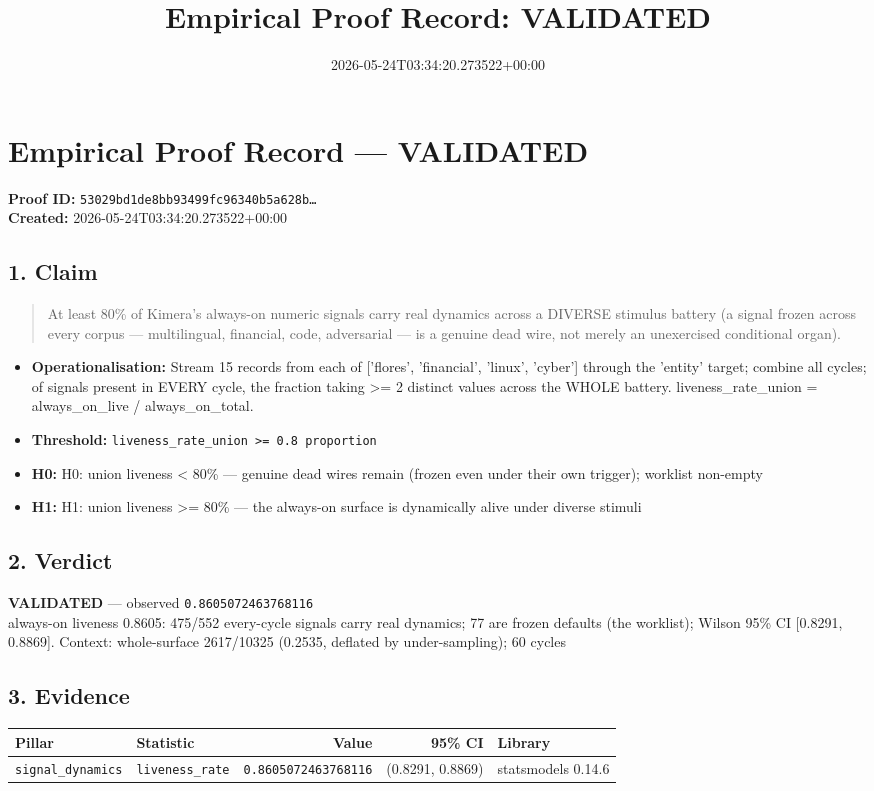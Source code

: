 \documentclass{article}
\title{Empirical Proof Record: VALIDATED}
\date{2026-05-24T03:34:20.273522+00:00}
\begin{document}
\maketitle
\section*{Empirical Proof Record --- \textcolor{validated}{\textbf{VALIDATED}}}
\textbf{Proof ID:} \texttt{53029bd1de8bb93499fc96340b5a628b\dots}\\
\textbf{Created:} 2026-05-24T03:34:20.273522+00:00
\subsection*{1. Claim}
\begin{quote}At least 80\% of Kimera's always-on numeric signals carry real dynamics across a DIVERSE stimulus battery (a signal frozen across every corpus — multilingual, financial, code, adversarial — is a genuine dead wire, not merely an unexercised conditional organ).\end{quote}
\begin{itemize}
\item \textbf{Operationalisation:} Stream 15 records from each of ['flores', 'financial', 'linux', 'cyber'] through the 'entity' target; combine all cycles; of signals present in EVERY cycle, the fraction taking >= 2 distinct values across the WHOLE battery. liveness\_rate\_union = always\_on\_live / always\_on\_total.
\item \textbf{Threshold:} \texttt{liveness\_rate\_union >= 0.8 proportion}
\item \textbf{H0:} H0: union liveness < 80\% — genuine dead wires remain (frozen even under their own trigger); worklist non-empty
\item \textbf{H1:} H1: union liveness >= 80\% — the always-on surface is dynamically alive under diverse stimuli
\end{itemize}
\subsection*{2. Verdict}
\textcolor{validated}{\textbf{VALIDATED}} --- observed \texttt{0.8605072463768116}\\
always-on liveness 0.8605: 475/552 every-cycle signals carry real dynamics; 77 are frozen defaults (the worklist); Wilson 95\% CI [0.8291, 0.8869]. Context: whole-surface 2617/10325 (0.2535, deflated by under-sampling); 60 cycles
\subsection*{3. Evidence}
\begin{tabular}{llrrl}\toprule
\textbf{Pillar} & \textbf{Statistic} & \textbf{Value} & \textbf{95\% CI} & \textbf{Library} \\\midrule
\texttt{signal\_dynamics} & \texttt{liveness\_rate} & \texttt{0.8605072463768116} & (0.8291, 0.8869) & statsmodels 0.14.6 \\
\bottomrule\end{tabular}
\end{document}
